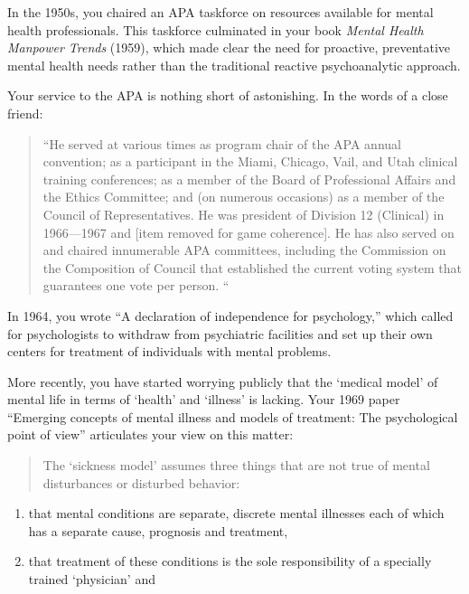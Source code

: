 \begin{refsection}
In the 1950s, you chaired an APA taskforce on resources available for mental health professionals. This taskforce culminated in your book \emph{Mental Health Manpower Trends} (1959), which made clear the need for proactive, preventative mental health needs rather than the traditional reactive psychoanalytic approach.

Your service to the APA is nothing short of astonishing. In the words of a close friend:

\begin{quote}

“He served at various times as program chair of the APA annual convention; as a participant in the Miami, Chicago, Vail, and Utah clinical training conferences; as a member of the Board of Professional Affairs and the Ethics Committee; and (on numerous occasions) as a member of the Council of Representatives. He was president of Division 12 (Clinical) in 1966—1967 and [item removed for game coherence]. He has also served on and chaired innumerable APA committees, including the Commission on the Composition of Council that established the current voting system that guarantees one vote per person. “
\end{quote}

In 1964, you wrote “A declaration of independence for psychology,” which called for psychologists to withdraw from psychiatric facilities and set up their own centers for treatment of individuals with mental problems. 

More recently, you have started worrying publicly that the ‘medical model’ of mental life in terms of ‘health’ and ‘illness’ is lacking. Your 1969 paper “Emerging concepts of mental illness and models of treatment: The psychological point of view” articulates your view on this matter:

\begin{quote}

The ‘sickness model’ assumes three things that are not true of mental disturbances or disturbed behavior: 
\end{quote}

\begin{enumerate}
\item that mental conditions are separate, discrete mental illnesses each of which has a separate cause, prognosis and treatment, 

\item that treatment of these conditions is the sole responsibility of a specially trained ‘physician’ and 


\end{enumerate}
\end{refsection}
